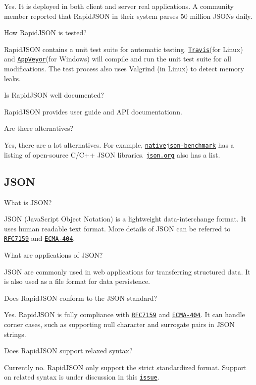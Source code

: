 \begin{DoxyEnumerate}
Yes. It is deployed in both client and server real applications. A community member reported that Rapid\+J\+S\+ON in their system parses 50 million J\+S\+O\+Ns daily.
\item How Rapid\+J\+S\+ON is tested?

Rapid\+J\+S\+ON contains a unit test suite for automatic testing. \href{https://travis-ci.org/miloyip/rapidjson/}{\tt Travis}(for Linux) and \href{https://ci.appveyor.com/project/miloyip/rapidjson/}{\tt App\+Veyor}(for Windows) will compile and run the unit test suite for all modifications. The test process also uses Valgrind (in Linux) to detect memory leaks.
\item Is Rapid\+J\+S\+ON well documented?

Rapid\+J\+S\+ON provides user guide and A\+PI documentationn.
\item Are there alternatives?

Yes, there are a lot alternatives. For example, \href{https://github.com/miloyip/nativejson-benchmark}{\tt nativejson-\/benchmark} has a listing of open-\/source C/\+C++ J\+S\+ON libraries. \href{http://www.json.org/}{\tt json.\+org} also has a list.
\end{DoxyEnumerate}

\subsection*{J\+S\+ON}


\begin{DoxyEnumerate}
\item What is J\+S\+ON?

J\+S\+ON (Java\+Script Object Notation) is a lightweight data-\/interchange format. It uses human readable text format. More details of J\+S\+ON can be referred to \href{http://www.ietf.org/rfc/rfc7159.txt}{\tt R\+F\+C7159} and \href{http://www.ecma-international.org/publications/standards/Ecma-404.htm}{\tt E\+C\+M\+A-\/404}.
\item What are applications of J\+S\+ON?

J\+S\+ON are commonly used in web applications for transferring structured data. It is also used as a file format for data persistence.
\end{DoxyEnumerate}
\begin{DoxyEnumerate}
\item Does Rapid\+J\+S\+ON conform to the J\+S\+ON standard?

Yes. Rapid\+J\+S\+ON is fully compliance with \href{http://www.ietf.org/rfc/rfc7159.txt}{\tt R\+F\+C7159} and \href{http://www.ecma-international.org/publications/standards/Ecma-404.htm}{\tt E\+C\+M\+A-\/404}. It can handle corner cases, such as supporting null character and surrogate pairs in J\+S\+ON strings.
\item Does Rapid\+J\+S\+ON support relaxed syntax?

Currently no. Rapid\+J\+S\+ON only support the strict standardized format. Support on related syntax is under discussion in this \href{https://github.com/miloyip/rapidjson/issues/36}{\tt issue}.
\end{DoxyEnumerate}

